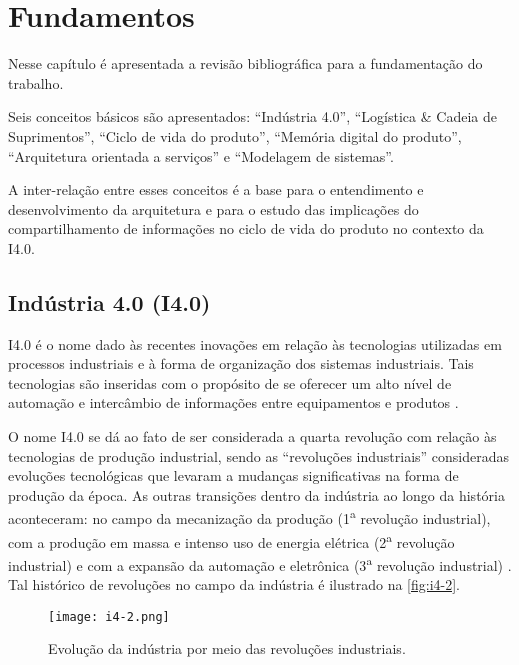 \chapter{Fundamentos}
\label{cha:fundamentos}

Nesse capítulo é apresentada a revisão bibliográfica para a fundamentação do trabalho.

Seis conceitos básicos são apresentados: ``Indústria 4.0'', ``Logística \& Cadeia de Suprimentos'', ``Ciclo de vida do produto'', ``Memória digital do produto'', ``Arquitetura orientada a serviços'' e ``Modelagem de sistemas''.

A inter-relação entre esses conceitos é a base para o entendimento e desenvolvimento da arquitetura e para o estudo das implicações do compartilhamento de informações no ciclo de vida do produto no contexto da I4.0.

\section{Indústria 4.0 (I4.0)}
\label{sec:industria4}

I4.0 é o nome dado às recentes inovações em relação às tecnologias utilizadas em processos industriais e à forma de organização dos sistemas industriais. Tais tecnologias são inseridas com o propósito de se oferecer um alto nível de automação e intercâmbio de informações entre equipamentos e produtos \cite{lasi2014industryfour}.

O nome I4.0 se dá ao fato de ser considerada a quarta revolução com relação às tecnologias de produção industrial, sendo as ``revoluções industriais'' consideradas evoluções tecnológicas que levaram a mudanças significativas na forma de produção da época. As outras transições dentro da indústria ao longo da história aconteceram: no campo da mecanização da produção (1\textsuperscript{a} revolução industrial), com a produção em massa e intenso uso de energia elétrica (2\textsuperscript{a} revolução industrial) e com a expansão da automação e eletrônica (3\textsuperscript{a} revolução industrial) \cite{lasi2014industryfour}. Tal histórico de revoluções no campo da indústria é ilustrado na \autoref{fig:i4-2}.

\begin{figure}[htb]
	\centering
	\texttt{[image: i4-2.png]}
	\caption{Evolução da indústria por meio das revoluções industriais.}
	\label{fig:i4-2}
\end{figure}

